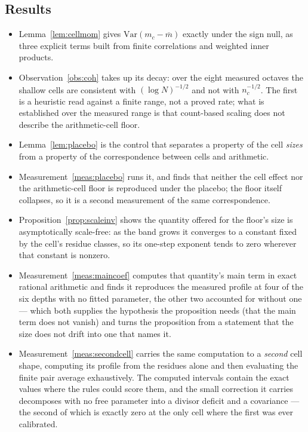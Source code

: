 \documentclass[11pt,a4paper]{article}
\theoremstyle{plain}
\theoremstyle{definition}
\theoremstyle{remark}
\begin{document}
\subsection{Results}

\begin{itemize}
\item Lemma~\ref{lem:cellmom} gives $\mathrm{Var}(m_c-\overline m)$
exactly under the sign null, as three explicit terms built from finite
correlations and weighted inner products.
\item Observation~\ref{obs:coh} takes up its decay: over the eight
measured octaves the shallow cells are consistent with
$(\log N)^{-1/2}$ and not with $n_c^{-1/2}$. The first is a heuristic
read against a finite range, not a proved rate; what is established over
the measured range is that count-based scaling does not describe the
arithmetic-cell floor.
\item Lemma~\ref{lem:placebo} is the control that separates a
property of the cell \emph{sizes} from a property of the
correspondence between cells and arithmetic.
\item Measurement~\ref{meas:placebo} runs it, and finds that neither the
cell effect nor the arithmetic-cell floor is reproduced under the
placebo; the floor itself collapses, so it is a second measurement of
the same correspondence.
\item Proposition~\ref{prop:scaleinv} shows the quantity offered for
the floor's size is asymptotically scale-free: as the band grows it
converges to a constant fixed by the cell's residue classes, so its
one-step exponent tends to zero wherever that constant is nonzero.
\item Measurement~\ref{meas:maincoef} computes that quantity's main
term in exact rational arithmetic and finds it reproduces the measured
profile at four of the six depths with no fitted parameter, the other
two accounted for without one --- which both
supplies the hypothesis the proposition needs (that the main term does
not vanish) and turns the proposition from a statement that the size
does not drift into one that names it.
\item Measurement~\ref{meas:secondcell} carries the same computation to
a \emph{second} cell shape, computing its profile from the residues alone
and then evaluating the finite pair average exhaustively. The computed
intervals contain the exact values where the rules could
score them, and the small
correction it carries decomposes with no free parameter into a divisor
deficit and a covariance --- the second of which is exactly zero at the
only cell where the first was ever calibrated.
\end{itemize}
\end{document}
